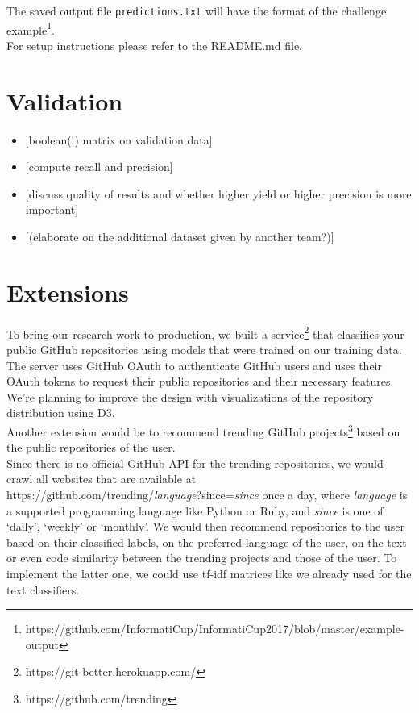 \documentclass[a4paper,12pt]{article}
\begin{document}
The saved output file \texttt{predictions.txt} will have the format of the challenge example\footnote{https://github.com/InformatiCup/InformatiCup2017/blob/master/example-output}.\\
For setup instructions please refer to the README.md file.

\section{Validation}\label{validation}

\begin{itemize}
\tightlist
\item
  {[}boolean(!) matrix on validation data{]}
\item
  {[}compute recall and precision{]}
\item
  {[}discuss quality of results and whether higher yield or higher
  precision is more important{]}
\item
  {[}(elaborate on the additional dataset given by another team?){]}
\end{itemize}

\section{Extensions}\label{extensions}

To bring our research work to production, we built a
service\footnote{https://git-better.herokuapp.com/} that classifies your
public GitHub repositories using models that were trained on our
training data. The server uses GitHub OAuth to authenticate GitHub users
and uses their OAuth tokens to request their public repositories and
their necessary features. We're planning to improve the design with
visualizations of the repository distribution using D3.\\
Another extension would be to recommend
trending GitHub projects\footnote{https://github.com/trending} based on
the public repositories of the user.\\
Since there is no official GitHub API for the trending repositories, we
would crawl all websites that are available at \\
https://github.com/trending/\textit{language}?since=\textit{since} once a day,
where \textit{language} is a supported programming language like Python or
Ruby, and \textit{since} is one of `daily', `weekly' or `monthly'. We
would then recommend repositories to the user based on their classified
labels, on the preferred language of the user, on the text or even code
similarity between the trending projects and those of the user. To
implement the latter one, we could use tf-idf matrices like we already
used for the text classifiers.
\end{document}
